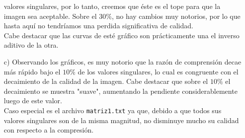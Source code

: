\documentclass[spanish, fleqn]{article}
\begin{document}
\begin{enumerate}
			valores singulares, por lo tanto, creemos que éste es el tope para
			que la imagen sea aceptable. Sobre el $30\%$, no hay cambios muy
			notorios, por lo que hasta aquí no tendríamos una perdida
			significativa de calidad.\\
			Cabe destacar que las curvas de esté gráfico son prácticamente una
			el inverso aditivo de la otra.
		\item[c)]
			Observando los gráficos, es muy notorio que la razón de comprensión
			decae más rápido bajo el $10\%$ de los valores singulares, lo cual
			es congruente con el decaimiento de la calidad de la imagen. Cabe
			destacar que sobre el $10\%$ el decaimiento se muestra "suave",
			aumentando la pendiente considerablemente luego de este valor.\\
			Caso especial es el archivo \texttt{matriz1.txt} ya que, debido a
			que todos sus valores singulares son de la misma magnitud, no 
			disminuye mucho su calidad con respecto a la compresión.
	\end{enumerate}
\end{document}
